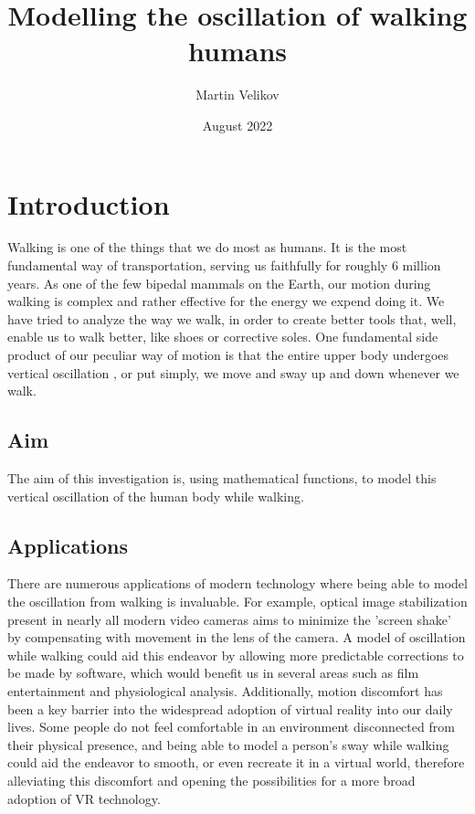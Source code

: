 \documentclass[12pt, a4paper]{article}
\title{Modelling the oscillation of walking humans}
\author{Martin Velikov}
\date{August 2022}
\begin{document}
\maketitle
\tableofcontents

\section{Introduction}
Walking is one of the things that we do most as humans. It is the most
fundamental way of transportation, serving us faithfully for roughly 6 million
years. As one of the few bipedal mammals on the Earth, our motion during walking
is complex and rather effective for the energy we expend doing it. We have tried
to analyze the way we walk, in order to create better tools that, well, enable
us to walk better, like shoes or corrective soles. One fundamental side product
of our peculiar way of motion is that the entire upper body undergoes vertical
oscillation , or put simply, we move and sway up and down whenever we walk.

\subsection{Aim}
The aim of this investigation is, using mathematical functions, to model this
vertical oscillation of the human body while walking.

\subsection{Applications}
There are numerous applications of modern technology where being able to model
the oscillation from walking is invaluable. For example, optical image
stabilization present in nearly all modern video cameras aims to minimize the
'screen shake' by compensating with movement in the lens of the camera. A model
of oscillation while walking could aid this endeavor by allowing more
predictable corrections to be made by software, which would benefit us in
several areas such as film entertainment and physiological analysis.
Additionally, motion discomfort has been a key barrier into the widespread
adoption of virtual reality into our daily lives. Some people do not feel
comfortable in an environment disconnected from their physical presence, and
being able to model a person's sway while walking could aid the endeavor to
smooth, or even recreate it in a virtual world, therefore alleviating this
discomfort and opening the possibilities for a more broad adoption of VR
technology.
\end{document}
